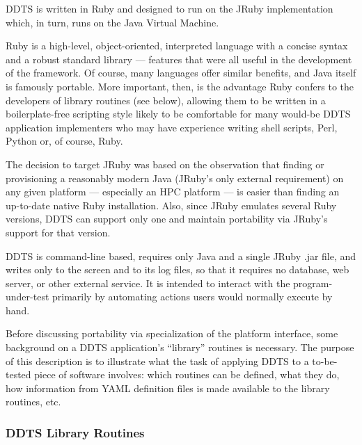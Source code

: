 \documentclass[conference]{IEEEtran}
\begin{document}
DDTS is written in Ruby \cite{ruby} and designed to run on the JRuby \cite{jruby} implementation which, in turn, runs on the Java Virtual Machine.

Ruby is a high-level, object-oriented, interpreted language with a concise syntax and a robust standard library --- features that were all useful in the development of the framework. Of course, many languages offer similar benefits, and Java itself is famously portable. More important, then, is the advantage Ruby confers to the developers of library routines (see below), allowing them to be written in a boilerplate-free scripting style likely to be comfortable for many would-be DDTS application implementers who may have experience writing shell scripts, Perl, Python or, of course, Ruby.

The decision to target JRuby was based on the observation that finding or provisioning a reasonably modern Java (JRuby's only external requirement) on any given platform --- especially an HPC platform --- is easier than finding an up-to-date native Ruby installation. Also, since JRuby emulates several Ruby versions, DDTS can support only one and maintain portability via JRuby's support for that version.

DDTS is command-line based, requires only Java and a single JRuby .jar file, and writes only to the screen and to its log files, so that it requires no database, web server, or other external service. It is intended to interact with the program-under-test primarily by automating actions users would normally execute by hand.

Before discussing portability via specialization of the platform interface, some background on a DDTS application's ``library'' routines is necessary. The purpose of this description is to illustrate what the task of applying DDTS to a to-be-tested piece of software involves: which routines can be defined, what they do, how information from YAML definition files is made available to the library routines, etc.

\subsubsection{DDTS Library Routines}
\end{document}
